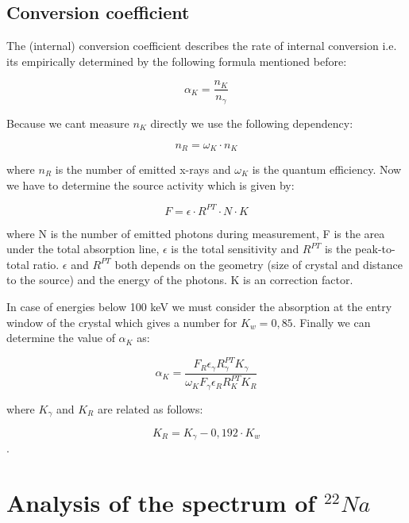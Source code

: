 \documentclass[bigchapter,colorback,accentcolor=tud4b,linedtoc,11pt]{tudreport}
\begin{document}
\subsection{Conversion coefficient}

The (internal) conversion coefficient describes the rate of internal conversion i.e. its empirically determined by the following formula mentioned before:

$$\alpha_K = \frac{n_K}{n_{\gamma}}$$

Because we cant measure $n_K$ directly we use the following dependency:

$$n_R = \omega_K \cdot n_K$$

where $n_R$ is the number of emitted x-rays and $\omega_K$ is the quantum efficiency. Now we have to determine the source activity which is given by:

$$F = \epsilon \cdot R^{PT} \cdot N \cdot K$$

where N is the number of emitted photons during measurement, F is the area under the total absorption line, $\epsilon$ is the total sensitivity and $R^{PT}$ is the peak-to-total ratio. $\epsilon$ and $R^{PT}$ both depends on the geometry (size of crystal and distance to the source) and the energy of the photons. K is an correction factor.

In case of energies below 100 keV we must consider the absorption at the entry window of the crystal which gives a number for $K_w = 0,85$. Finally we can determine the value of $\alpha_K$ as:

$$\alpha_K = \frac{F_R \epsilon_{\gamma} R_{\gamma}^{PT}  K_{\gamma}}{\omega_K F_{\gamma} \epsilon_R R_K^{PT} K_R}$$

where $K_{\gamma}$  and $K_R$ are related as follows: 

$$K_R = K_{\gamma} - 0,192 \cdot K_w$$.

\section{Analysis of the spectrum of $^{22}Na$}
\end{document}
